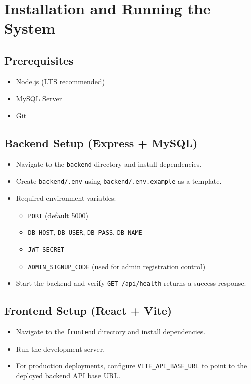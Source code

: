 \documentclass[12pt]{article}
\begin{document}
\newpage

\section{Installation and Running the System}
\subsection{Prerequisites}
\begin{itemize}
  \item Node.js (LTS recommended)
  \item MySQL Server
  \item Git
\end{itemize}

\subsection{Backend Setup (Express + MySQL)}
\begin{itemize}
  \item Navigate to the \texttt{backend} directory and install dependencies.
  \item Create \texttt{backend/.env} using \texttt{backend/.env.example} as a template.
  \item Required environment variables:
  \begin{itemize}
    \item \texttt{PORT} (default 5000)
    \item \texttt{DB\_HOST}, \texttt{DB\_USER}, \texttt{DB\_PASS}, \texttt{DB\_NAME}
    \item \texttt{JWT\_SECRET}
    \item \texttt{ADMIN\_SIGNUP\_CODE} (used for admin registration control)
  \end{itemize}
  \item Start the backend and verify \texttt{GET /api/health} returns a success response.
\end{itemize}

\subsection{Frontend Setup (React + Vite)}
\begin{itemize}
  \item Navigate to the \texttt{frontend} directory and install dependencies.
  \item Run the development server.
  \item For production deployments, configure \texttt{VITE\_API\_BASE\_URL} to point to the deployed backend API base URL.
\end{itemize}
\end{document}
